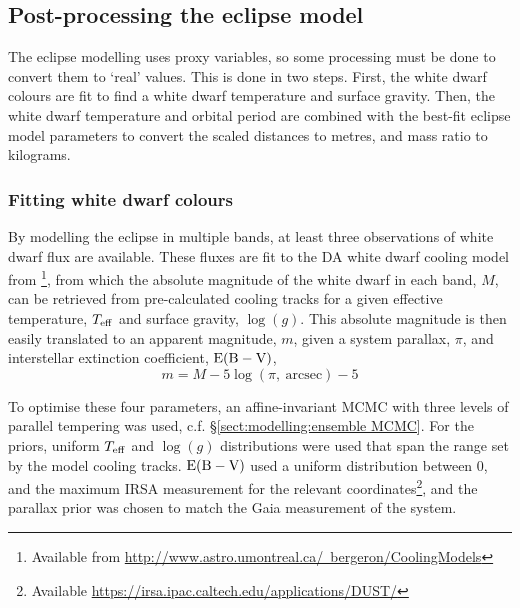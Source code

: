 \subsection{Post-processing the eclipse model}\label{sect:modelling:post processing the eclipse model}

The eclipse modelling uses proxy variables, so some processing must be done to convert them to `real' values. This is done in two steps. First, the white dwarf colours are fit to find a white dwarf temperature and surface gravity. Then, the white dwarf temperature and orbital period are combined with the best-fit eclipse model parameters to convert the scaled distances to metres, and mass ratio to kilograms.

\subsubsection{Fitting white dwarf colours}\label{sect:modelling:fitting white dwarf colours}
By modelling the eclipse in multiple bands, at least three observations of white dwarf flux are available. These fluxes are fit to the DA white dwarf cooling model from \citet{Bergeron1995}\footnote{Available from \href{http://www.astro.umontreal.ca/~bergeron/CoolingModels}{http://www.astro.umontreal.ca/~bergeron/CoolingModels}}, from which the absolute magnitude of the white dwarf in each band, $M$, can be retrieved from pre-calculated cooling tracks for a given effective temperature, $T_{\rm eff}$ and surface gravity, $\log (g)$. This absolute magnitude is then easily translated to an apparent magnitude, $m$, given a system parallax, $\pi$, and interstellar extinction coefficient, $\rm E(B-V)$,
\begin{equation}
    m = M - 5\log (\pi\mathrm{,\ arcsec}) - 5
\end{equation}

To optimise these four parameters, an affine-invariant MCMC with three levels of parallel tempering was used, c.f. \S\ref{sect:modelling:ensemble MCMC}. For the priors, uniform $T_{\rm eff}$ and $\log (g)$ distributions were used that span the range set by the model cooling tracks. $\rm E(B-V)$ used a uniform distribution between 0, and the maximum IRSA measurement for the relevant coordinates\footnote{Available \href{https://irsa.ipac.caltech.edu/applications/DUST/}{https://irsa.ipac.caltech.edu/applications/DUST/}}, and the parallax prior was chosen to match the Gaia measurement \citep{lindegren2018, Luri2018, Gaia2016, Gaia2018} of the system.

